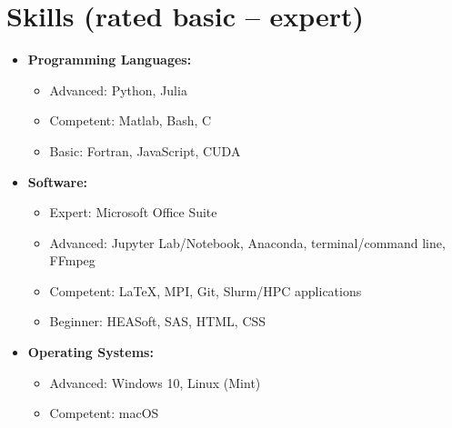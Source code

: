 \documentclass[11pt]{article}
\begin{document}
\section{Skills (rated basic -- expert)}
\begin{itemize}[noitemsep]
\item \textbf{Programming Languages:}
    \begin{itemize}[noitemsep]
    \item Advanced: Python, Julia
    \item Competent: Matlab, Bash, C
    \item Basic: Fortran, JavaScript, CUDA
    \end{itemize}
\item \textbf{Software:}
    \begin{itemize}[noitemsep]
    \item Expert: Microsoft Office Suite
    \item Advanced: Jupyter Lab/Notebook, Anaconda, terminal/command line, FFmpeg
    \item Competent: \LaTeX, MPI, Git, Slurm/HPC applications
    \item Beginner: HEASoft, SAS, HTML, CSS
    \end{itemize}
\item \textbf{Operating Systems:}
    \begin{itemize}[noitemsep]
    \item Advanced: Windows 10, Linux (Mint)
    \item Competent: macOS
    \end{itemize}
\end{itemize}
\end{document}
